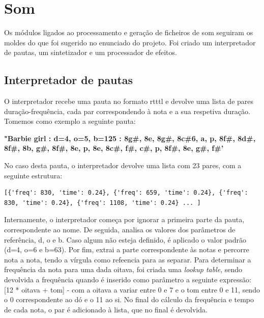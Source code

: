 \chapter{Som}
\label{chap.som}

Os módulos ligados ao processamento e geração de ficheiros de som seguiram os moldes do que foi sugerido no enunciado do projeto. Foi criado um interpretador de pautas, um sintetizador e um processador de efeitos.

\section{Interpretador de pautas}

O interpretador recebe uma pauta no formato \ac{rtttl} e devolve uma lista de pares duração-frequência, cada par correspondendo à nota e a sua respetiva duração. Tomemos como exemplo a seguinte pauta:

\vspace{5mm}
\textbf{"Barbie girl : d=4, o=5, b=125 : 8g\#, 8e, 8g\#, 8c\#6, a, p, 8f\#, 8d\#, 8f\#, 8b, g\#, 8f\#, 8e, p, 8e, 8c\#, f\#, c\#, p, 8f\#, 8e, g\#, f\#'}
\vspace{5mm}

No caso desta pauta, o interpretador devolve uma lista com 23 pares, com a seguinte estrutura:

\vspace{5mm}
\begin{lstlisting}
[{'freq': 830, 'time': 0.24}, {'freq': 659, 'time': 0.24}, {'freq': 830, 'time': 0.24}, {'freq': 1108, 'time': 0.24} ... ]
\end{lstlisting}
\vspace{5mm}

Internamente, o interpretador começa por ignorar a primeira parte da pauta, correspondente ao nome. De seguida, analisa os valores dos parâmetros de referência, d, o e b. Caso algum não esteja definido, é aplicado o valor padrão (d=4, o=6 e b=63). Por fim, extrai a parte correspondente às notas e percorre nota a nota, tendo a vírgula como refeencia para as separar. Para determinar a frequência da nota para uma dada oitava, foi criada uma \emph{lookup table}, sendo devolvida a frequência quando é inserido como parâmetro a seguinte expressão: [12 * oitava + tom] - com a oitava a variar entre 0 e 7 e o tom entre 0 e 11, sendo o 0 correspondente ao dó e o 11 ao si. No final do cálculo da frequência e tempo de cada nota, o par é adicionado à lista, que no final é devolvida.

